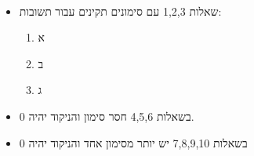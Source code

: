 \documentclass[12pt, a4paper]{article}
\begin{document}
\begin{center}
\ 

\begin{itemize}[label=$\bullet$]
    \item שאלות 1,2,3 עם סימונים תקינים עבור תשובות:
    \begin{enumerate}
        \item א
        \item ב
        \item ג
    \end{enumerate}
    \item בשאלות 4,5,6 חסר סימון והניקוד יהיה 0.
    \item בשאלות 7,8,9,10
    יש יותר מסימון אחד והניקוד יהיה 0
\end{itemize}


\end{center}



\pagebreak


\end{document}
